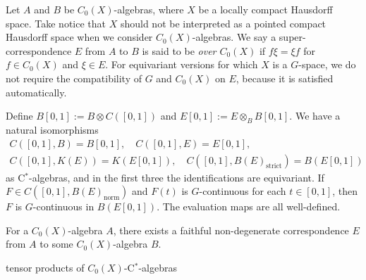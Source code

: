 \documentclass{../../large}
\begin{document}
\begin{prb}
Let $A$ and $B$ be $C_0(X)$-algebras, where $X$ be a locally compact Hausdorff space.
Take notice that $X$ should not be interpreted as a pointed compact Hausdorff space when we consider $C_0(X)$-algebras.
We say a super-correspondence $E$ from $A$ to $B$ is said to be \emph{over $C_0(X)$} if $f\xi=\xi f$ for $f\in C_0(X)$ and $\xi\in E$.
For equivariant versions for which $X$ is a $G$-space, we do not require the compatibility of $G$ and $C_0(X)$ on $E$, because it is satisfied automatically.





\begin{parts}
\item 
\item Define $B[0,1]:=B\otimes C([0,1])$ and $E[0,1]:=E\otimes_BB[0,1]$. We have a natural isomorphisms
\begin{gather*}C([0,1],B)=B[0,1],\quad C([0,1],E)=E[0,1],\\
C([0,1],K(E))=K(E[0,1]),\quad C([0,1],B(E)_{\mathrm{strict}})=B(E[0,1])
\end{gather*}
as C$^*$-algebras, and in the first three the identifications are equivariant.
If $F\in C([0,1],B(E)_{\mathrm{norm}})$ and $F(t)$ is $G$-continuous for each $t\in[0,1]$, then $F$ is $G$-continuous in $B(E[0,1])$. The evaluation maps are all well-defined.
\item For a $C_0(X)$-algebra $A$, there exists a faithful non-degenerate correspondence $E$ from $A$ to some $C_0(X)$-algebra $B$.
\item tensor products of $C_0(X)$-C$^*$-algebras
\end{parts}
\end{prb}
\end{document}
